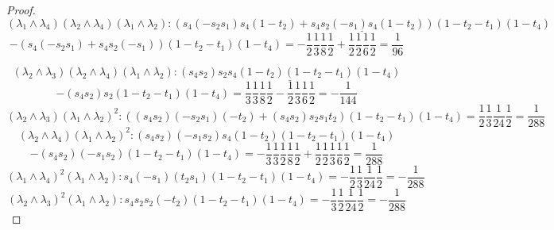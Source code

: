 \documentclass[11pt]{amsart}
\theoremstyle{definition}
\theoremstyle{remark}
\numberwithin{equation}{section}
\begin{document}
\begin{proof}
$$
\left(\lambda_1 \wedge \lambda_4\right)\left(\lambda_2 \wedge \lambda_4\right)\left(\lambda_1 \wedge \lambda_2\right):\underline{(s_4(-s_2s_1)s_4(1-t_2)+s_4s_2(-s_1)s_4(1-t_2))(1-t_2-t_1)(1-t_4)}
$$
$$
-(s_4(-s_2s_1)+s_4s_2(-s_1))(1-t_2-t_1)(1-t_4)=-\frac{1}{2}\frac{1}{3}\frac{1}{8}\frac{1}{2}+\frac{1}{2}\frac{1}{2}\frac{1}{6}\frac{1}{2}=\frac{1}{96}
$$

$$
\left(\lambda_2 \wedge \lambda_3\right)\left(\lambda_2 \wedge \lambda_4\right)\left(\lambda_1 \wedge \lambda_2\right):\underline{(s_4s_2)s_2s_4(1-t_2)(1-t_2-t_1)(1-t_4)}
$$
$$
-(s_4s_2)s_2(1-t_2-t_1)(1-t_4)=\frac{1}{3}\frac{1}{3}\frac{1}{8}\frac{1}{2}-\frac{1}{2}\frac{1}{3}\frac{1}{6}\frac{1}{2}=-\frac{1}{144}
$$
$$
\left(\lambda_2 \wedge \lambda_3\right)\left(\lambda_1 \wedge \lambda_2\right)^2:((s_4s_2)(-s_2s_1)(-t_2)+(s_4s_2)s_2s_1t_2)(1-t_2-t_1)(1-t_4)=\frac{1}{2}\frac{1}{3}\frac{1}{24}\frac{1}{2}=\frac{1}{288}
$$
$$
\left(\lambda_2 \wedge \lambda_4\right)\left(\lambda_1 \wedge \lambda_2\right)^2:(s_4s_2)(-s_1s_2)s_4(1-t_2)(1-t_2-t_1)(1-t_4)
$$
$$
-(s_4s_2)(-s_1s_2)(1-t_2-t_1)(1-t_4)=-\frac{1}{3}\frac{1}{3}\frac{1}{2}\frac{1}{8}\frac{1}{2}+\frac{1}{2}\frac{1}{2}\frac{1}{3}\frac{1}{6}\frac{1}{2}=\frac{1}{288}
$$
$$
\left(\lambda_1 \wedge \lambda_4\right)^2\left(\lambda_1 \wedge \lambda_2\right):s_4(-s_1)(t_2s_1)(1-t_2-t_1)(1-t_4)=-\frac{1}{2}\frac{1}{3}\frac{1}{24}\frac{1}{2}=-\frac{1}{288}
$$
$$
\left(\lambda_2 \wedge \lambda_3\right)^2\left(\lambda_1 \wedge \lambda_2\right):s_4s_2s_2(-t_2)(1-t_2-t_1)(1-t_4)=-\frac{1}{3}\frac{1}{2}\frac{1}{24}\frac{1}{2}=-\frac{1}{288}
$$


\end{proof}
\end{document}
